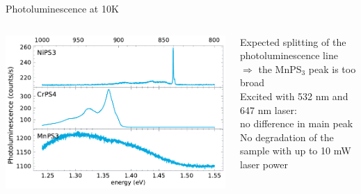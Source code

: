 \documentclass[
	10pt,
]{beamer}
\begin{document}
\begin{frame}{Photoluminescence at 10K}
	\begin{columns}
		\centering
		\includegraphics[width=\textwidth]{../figures/2023-12-10 Combined PL.pdf}

		Expected splitting of the photoluminescence line\\
		$\Rightarrow$ the MnPS$_3$ peak is too broad
		\vspace{.5cm}\\
		Excited with 532 nm and 647 nm laser:\\
		no difference in main peak
		\vspace{.5cm}\\
		No degradation of the sample with up to 10 mW laser power
	\end{columns}
\end{frame}
\end{document}
